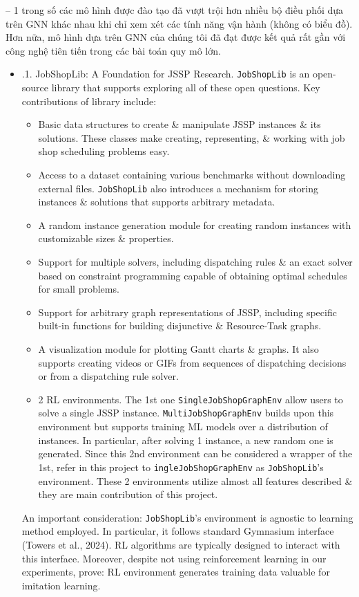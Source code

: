 \documentclass{article}
\begin{document}
\begin{itemize}
\begin{itemize}
        -- 1 trong số các mô hình được đào tạo đã vượt trội hơn nhiều bộ điều phối dựa trên GNN khác nhau khi chỉ xem xét các tính năng vận hành (không có biểu đồ). Hơn nữa, mô hình dựa trên GNN của chúng tôi đã đạt được kết quả rất gần với công nghệ tiên tiến trong các bài toán quy mô lớn.
        \begin{itemize}
            \item {.1. JobShopLib: A Foundation for JSSP Research.} {\tt JobShopLib} is an open-source library that supports exploring all of these open questions. Key contributions of library include:
            \begin{itemize}
                \item Basic data structures to create \& manipulate JSSP instances \& its solutions. These classes make creating, representing, \& working with job shop scheduling problems easy.
                \item Access to a dataset containing various benchmarks without downloading external files. {\tt JobShopLib} also introduces a mechanism for storing instances \& solutions that supports arbitrary metadata.
                \item A random instance generation module for creating random instances with customizable sizes \& properties.
                \item Support for multiple solvers, including dispatching rules \& an exact solver based on constraint programming capable of obtaining optimal schedules for small problems.
                \item Support for arbitrary graph representations of JSSP, including specific built-in functions for building disjunctive \& Resource-Task graphs.
                \item A visualization module for plotting Gantt charts \& graphs. It also supports creating videos or GIFs from sequences of dispatching decisions or from a dispatching rule solver.
                \item 2 RL environments. The 1st one {\tt SingleJobShopGraphEnv} allow users to solve a single JSSP instance. {\tt MultiJobShopGraphEnv} builds upon this environment but supports training ML models over a distribution of instances. In particular, after solving 1 instance, a new random one is generated. Since this 2nd environment can be considered a wrapper of the 1st, refer in this project to {\tt ingleJobShopGraphEnv} as {\tt JobShopLib}'s environment. These 2 environments utilize almost all features described \& they are main contribution of this project.
            \end{itemize}
            An important consideration: {\tt JobShopLib}'s environment is agnostic to learning method employed. In particular, it follows standard Gymnasium interface (Towers et al., 2024). RL algorithms are typically designed to interact with this interface. Moreover, despite not using reinforcement learning in our experiments, prove: RL environment generates training data valuable for imitation learning.


\end{itemize}
\end{itemize}
\end{itemize}
\end{document}
